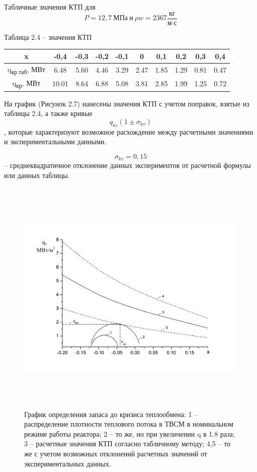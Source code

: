 Табличные значения КТП для
\[P = 12,7\ \textrm{МПа}\ \textrm{и}\ \rho w = 2367\frac{\textrm{кг}}{\textrm{м} \cdot \textrm{с}}\]


Таблица 2.4 -- значения КТП

\begin{longtable}[]{@{}|c|c|c|c|c|c|c|c|c|c|@{}}
\toprule
x & -0,4 & -0,3 & -0,2 & -0,1 & 0 & 0,1 & 0,2 & 0,3 & 0,4\tabularnewline
\midrule
\endhead
q\textsubscript{кр.таб}, МВт & 6.48 & 5.60 & 4.46 & 3.29 & 2.47 & 1.85 &
1.29 & 0.81 & 0.47\tabularnewline
q\textsubscript{кр}, МВт & 10.01 & 8.64 & 6.88 & 5.08 & 3.81 & 2.85 &
1.99 & 1.25 & 0.72\tabularnewline
\bottomrule
\end{longtable}

На график (Рисунок 2.7) нанесены значения КТП с учетом поправок, взятые
из таблицы 2.4, а также кривые
\[q_{kr}\left( 1 \pm \sigma_{kv} \right)\], которые характеризуют
возможное расхождение между расчетными значениями и экспериментальными
данными.

\[\sigma_{kv} = 0,15\] -- среднеквадратичное отклонение данных
экспериментов от расчетной формулы или данных таблицы.

\begin{figure}[!h]
\center
\includegraphics[width=6.49583in,height=4.53750in]{media/image11.png}
\caption{График определения запаса до кризиса теплообмена: 1 --
распределение плотности теплового потока в ТВСМ в номинальном режиме
работы реактора; 2 -- то же, но при увеличении q в 1.8 раза; 3 --
расчетные значения КТП согласно табличному методу; 4,5 -- то же с учетом
возможных отклонений расчетных значений от экспериментальных данных.}
\end{figure}

